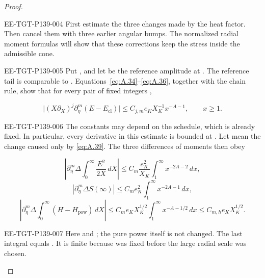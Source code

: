 \begin{proof}
\begin{EESegment}{EE-TGT-P139-004}
First estimate the three changes made by the heat factor. Then cancel them with three earlier angular bumps. The
normalized radial moment formulas will show that these corrections keep the stress inside the admissible cone.
\end{EESegment}

\begin{EESegment}{EE-TGT-P139-005}
Put , and let  be the reference amplitude at
. The reference tail is comparable to .
Equations~\eqref{eq:A.34}--\eqref{eq:A.36}, together with the chain rule, show that for every pair of fixed integers
,
\end{EESegment}
\[
  \bigl|(X\partial_X)^j\partial_\eta^m(E-E_{\mathrm{cl}})\bigr|
  \leq C_{j,m}e_KX_K^{-1}x^{-A-1},\qquad x\geq 1.
\]
\begin{EESegment}{EE-TGT-P139-006}
The constants may depend on the schedule, which is already fixed. In particular, every derivative in this estimate is
bounded at . Let  mean the change caused only by
\eqref{eq:A.39}. The three differences of moments then obey
\end{EESegment}
\begin{equation}
  \left|\partial_\eta^m\Delta\int_0^\infty\frac{E^2}{2X}\,dX\right|
  \leq C_m\frac{e_K^2}{X_K}\int_1^\infty x^{-2A-2}\,dx,
  \tag{A.40}\label{eq:A.40}
\end{equation}
\begin{equation}
  \left|\partial_\eta^m\Delta S(\infty)\right|
  \leq C_me_K^2\int_1^\infty x^{-2A-1}\,dx,
  \tag{A.41}\label{eq:A.41}
\end{equation}
\begin{equation}
  \left|\partial_\eta^m\Delta\int_0^\infty(H-H_{\mathrm{pow}})\,dX\right|
  \leq C_me_KX_K^{1/2}\int_1^\infty x^{-A-1/2}\,dx
  \leq C_{m,h}e_KX_K^{1/2}.
  \tag{A.42}\label{eq:A.42}
\end{equation}
\begin{EESegment}{EE-TGT-P139-007}
Here  and
; the pure power itself is not changed. The last
integral equals . It is finite because
 was fixed before the large radial scale was chosen.
\end{EESegment}


\end{proof}
